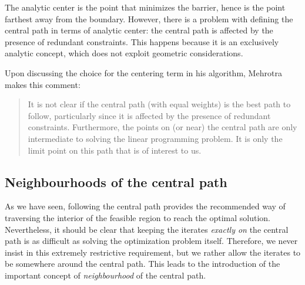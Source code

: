 The analytic center is the point that minimizes the barrier, hence
is the point farthest away from the boundary.
However, there is a problem with defining the central path in terms
of analytic center: the central path is affected by the presence of 
redundant constraints. 
This happens because it is an exclusively analytic concept, which does
not exploit geometric considerations.





Upon discussing the choice for the centering term in his algorithm,
Mehrotra \cite{Mehrotra92} makes this comment:
\begin{quote}
It is not clear if the central path (with
equal weights) is the best path to follow, particularly since it
is affected by the presence of redundant constraints. Furthermore,
the points on (or near) the central path are only intermediate to
solving the linear programming problem. It is only the limit point 
on this path that is of interest to us.
\end{quote}


%
%
\subsection{Neighbourhoods of the central path}
\label{sec:Neighbourhoods}

As we have seen, following the central path provides the recommended
way of traversing the interior of the feasible region to reach
the optimal solution. Nevertheless, it should be clear that keeping the
iterates {\em exactly on} the central path is as difficult as
solving the optimization problem itself.
%
Therefore, we never insist in this extremely restrictive requirement,
but we rather allow the iterates to be somewhere around the central path.
This leads to the introduction of the important concept of
{\em neighbourhood} of the central path. 

